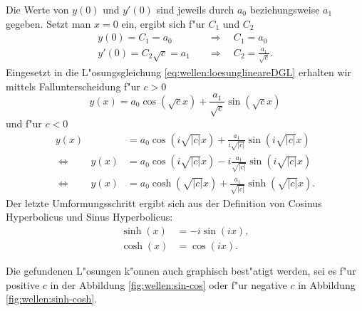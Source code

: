 Die Werte von $y(0)$ und $y'(0)$ sind jeweils durch $a_0$ beziehungsweise $a_1$ 
gegeben. Setzt man $x = 0$ ein, ergibt sich f"ur $C_1$ und $C_2$
\begin{equation*}
	\begin{split}
		y(0) = C_1 = a_0 &\quad\Rightarrow\quad C_1 = a_0 \\
		y'(0) = C_2 \sqrt{c} = a_1 &\quad\Rightarrow\quad C_2 = \frac{a_1}{\sqrt{c}}.
	\end{split}
\end{equation*}
Eingesetzt in die L"osungsgleichung \eqref{eq:wellen:loesunglineareDGL} 
erhalten wir mittels Fallunterscheidung f"ur $c > 0$
\begin{equation*}
	y(x) = a_0 \cos(\sqrt{c}x) + \frac{a_1}{\sqrt{c}} \sin(\sqrt{c}x)
\end{equation*}
und f"ur $c < 0$
\begin{equation*}
	\begin{split}
		y(x) &= a_0 \cos(i\sqrt{|c|}x) + 
		\frac{a_1}{i\sqrt{|c|}}\sin(i\sqrt{|c|}x)\\
		\Leftrightarrow \qquad
		y(x) &= a_0 \cos(i\sqrt{|c|}x) - 
		i\frac{a_1}{\sqrt{|c|}}\sin(i\sqrt{|c|}x)\\
		\Leftrightarrow \qquad
		y(x) &= a_0 \cosh(\sqrt{|c|}x) + 
		\frac{a_1}{\sqrt{|c|}}\sinh(\sqrt{|c|}x).
	\end{split}	
\end{equation*}
Der letzte Umformungsschritt ergibt sich aus der Definition von Cosinus 
Hyperbolicus und Sinus Hyperbolicus:
\begin{equation*}
	\begin{split}
		\sinh(x) &= -i \sin(ix),\\
		\cosh(x) &= \cos (ix).
	\end{split}
\end{equation*}

Die gefundenen L"osungen k"onnen auch graphisch best"atigt werden, sei es f"ur 
positive $c$ in der Abbildung \ref{fig:wellen:sin-cos} oder f"ur negative $c$ 
in Abbildung \ref{fig:wellen:sinh-cosh}.

